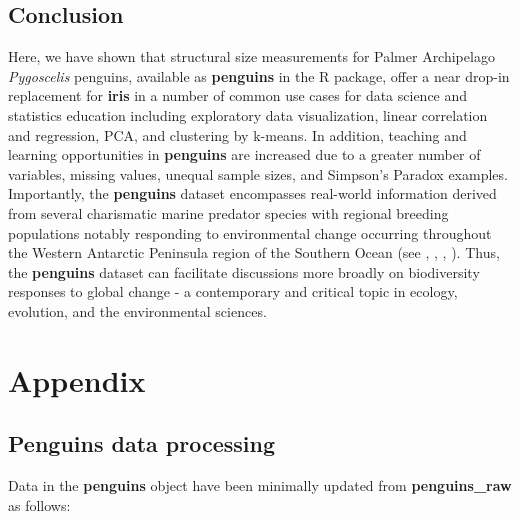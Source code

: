 \hypertarget{conclusion}{%
\subsection{Conclusion}\label{conclusion}}

Here, we have shown that structural size measurements for Palmer
Archipelago \emph{Pygoscelis} penguins, available as \textbf{penguins}
in the  R package, offer a near drop-in
replacement for \textbf{iris} in a number of common use cases for data
science and statistics education including exploratory data
visualization, linear correlation and regression, PCA, and clustering by
k-means. In addition, teaching and learning opportunities in
\textbf{penguins} are increased due to a greater number of variables,
missing values, unequal sample sizes, and Simpson's Paradox examples.
Importantly, the \textbf{penguins} dataset encompasses real-world
information derived from several charismatic marine predator species
with regional breeding populations notably responding to environmental
change occurring throughout the Western Antarctic Peninsula region of
the Southern Ocean (see \citet{bestelmeyer_analysis_2011},
\citet{gorman_ecological_2014}, \citet{gorman_population_2017},
\citet{gorman_advancing_2021}). Thus, the \textbf{penguins} dataset can
facilitate discussions more broadly on biodiversity responses to global
change - a contemporary and critical topic in ecology, evolution, and
the environmental sciences.

\hypertarget{appendix}{%
\section*{Appendix}\label{appendix}}

\hypertarget{penguins-data-processing}{%
\subsection{Penguins data processing}\label{penguins-data-processing}}

Data in the \textbf{penguins} object have been minimally updated from
\textbf{penguins\_raw} as follows:

